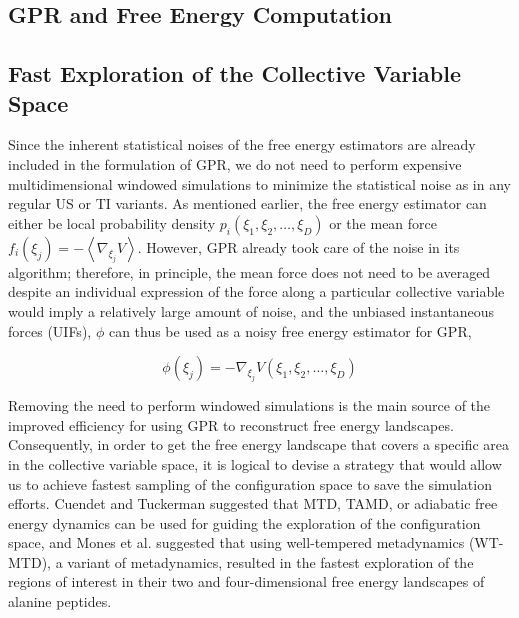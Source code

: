 \begin{spacing}{2.0}
    \section{GPR and Free Energy Computation}

    \subsection{Fast Exploration of the Collective Variable Space}

    Since the inherent statistical noises of the free energy estimators are already included in the formulation of GPR, we do not need to perform 
    expensive multidimensional windowed simulations to minimize the statistical noise as in any regular US or TI variants. As mentioned earlier, 
    the free energy estimator can either be local probability density $p_i(\xi_1,\xi_2,\ldots,\xi_D)$ or the mean force 
    $f_i(\xi_j) = -\left<\nabla_{\xi_j}V\right>$. However, GPR already took care of the noise in its algorithm; therefore, in principle, the mean 
    force does not need to be averaged despite an individual expression of the force along a particular collective variable would imply a relatively 
    large amount of noise, and the unbiased instantaneous forces (UIFs), $\phi$ can thus be used as a noisy free energy estimator for GPR,

    \begin{equation}
        \phi(\xi_j) = -\nabla_{\xi_j}V(\xi_1,\xi_2,\ldots,\xi_D)
        \label{eq:uif-definition}
    \end{equation}

    Removing the need to perform windowed simulations is the main source of the improved efficiency for using GPR to reconstruct free energy
    landscapes. Consequently, in order to get the free energy landscape that covers a specific area in the collective variable space, it is
    logical to devise a strategy that would allow us to achieve fastest sampling of the configuration space to save the simulation efforts.
    Cuendet and Tuckerman \cite{P-JCTC-2014-v10-Cuendet} suggested that MTD, TAMD, or adiabatic free energy dynamics can be used for guiding
    the exploration of the configuration space, and Mones et al. \cite{P-JCTC-2016-v12-Mones} suggested that using well-tempered metadynamics
    (WT-MTD), a variant of metadynamics, resulted in the fastest exploration of the regions of interest in their two and four-dimensional
    free energy landscapes of alanine peptides. 
\end{spacing}

